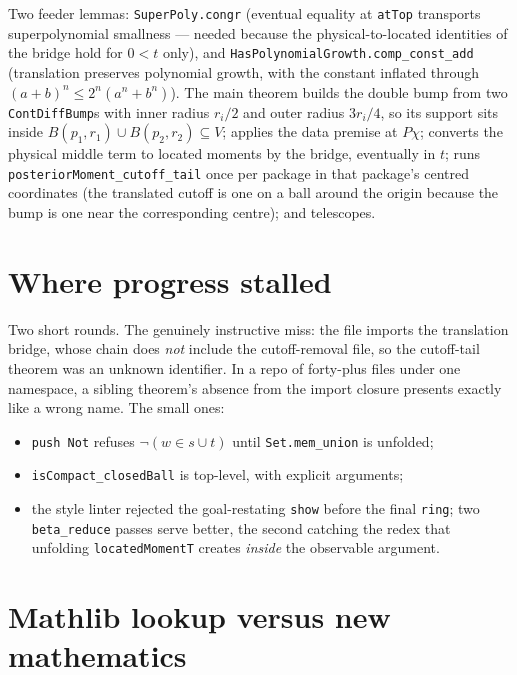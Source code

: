 \documentclass[11pt]{article}
\newcommand{\code}[1]{\texttt{#1}}
\begin{document}
\begin{sloppypar}
Two feeder lemmas: \code{SuperPoly.congr} (eventual equality at
\code{atTop} transports superpolynomial smallness --- needed because
the physical-to-located identities of the bridge hold for $0 < t$
only), and \code{HasPolynomialGrowth.comp\_const\_add} (translation
preserves polynomial growth, with the constant inflated through
$(a+b)^n \le 2^n(a^n + b^n)$). The main theorem builds the double
bump from two \code{ContDiffBump}s with inner radius $r_i/2$ and
outer radius $3r_i/4$, so its support sits inside
$B(p_1, r_1) \cup B(p_2, r_2) \subseteq V$; applies the data premise
at $P\chi$; converts the physical middle term to located moments by
the bridge, eventually in $t$; runs
\code{posteriorMoment\_cutoff\_tail} once per package in that
package's centred coordinates (the translated cutoff is one on a
ball around the origin because the bump is one near the
corresponding centre); and telescopes.
\end{sloppypar}

\section{Where progress stalled}

Two short rounds. The genuinely instructive miss: the file imports
the translation bridge, whose chain does \emph{not} include the
cutoff-removal file, so the cutoff-tail theorem was an unknown
identifier. In a repo of forty-plus files under one namespace, a
sibling theorem's absence from the import closure presents exactly
like a wrong name. The small ones:
\begin{itemize}
\item \code{push Not} refuses $\lnot(w \in s \cup t)$ until
  \code{Set.mem\_union} is unfolded;
\item \code{isCompact\_closedBall} is top-level, with explicit
  arguments;
\item the style linter rejected the goal-restating \code{show}
  before the final \code{ring}; two \code{beta\_reduce} passes serve
  better, the second catching the redex that unfolding
  \code{locatedMomentT} creates \emph{inside} the observable
  argument.
\end{itemize}

\section{Mathlib lookup versus new mathematics}
\end{document}
